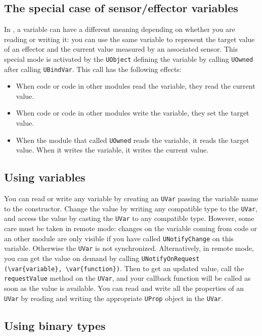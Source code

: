 \subsection{The special case of sensor/effector variables}

In \urbi, a variable can have a different meaning depending on whether
you are reading or writing it: you can use the same variable to
represent the target value of an effector and the current value
measured by an associated sensor. This special mode is activated by
the \lstinline{UObject} defining the variable by calling
\lstinline{UOwned} after calling \lstinline{UBindVar}. This call has
the following effects:
\begin{itemize}
\item When \urbi code or code in other modules read the variable, they
  read the current value.
\item When \urbi code or code in other modules write the variable,
  they set the target value.
\item When the module that called \lstinline|UOwned| reads the
  variable, it reads the target value. When it writes the variable, it
  writes the current value.
\end{itemize}

\subsection{Using \urbi variables}

You can read or write any \urbi variable by creating an
\lstinline{UVar} passing the variable name to the constructor. Change
the value by writing any compatible type to the \lstinline{UVar}, and
access the value by casting the \lstinline{UVar} to any compatible
type. However, some care must be taken in remote mode: changes on the
variable coming from \urbi code or an other module are only visible if
you have called \lstinline{UNotifyChange} on this variable. Otherwise
the \lstinline{UVar} is not synchronized. Alternatively, in remote
mode, you can get the value on demand by calling
\lstinline|UNotifyOnRequest (\var{variable}, \var{function})|. Then to get an
updated value, call the \lstinline{requestValue} method on the
\lstinline{UVar}, and your callback function will be called as soon as
the value is available. You can read and write all the \urbi
properties of an \lstinline{UVar} by reading and writing the
appropriate \lstinline{UProp} object in the \lstinline{UVar}.

\subsection{Using binary types}

